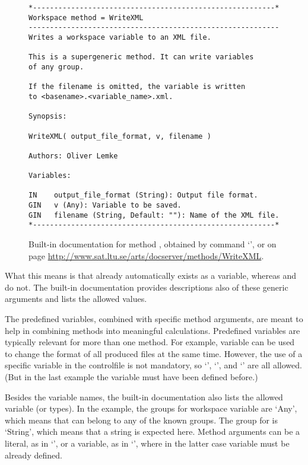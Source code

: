 \begin{figure}
\footnotesize
\begin{lstlisting}
*---------------------------------------------------------*
Workspace method = WriteXML
-----------------------------------------------------------
Writes a workspace variable to an XML file.

This is a supergeneric method. It can write variables 
of any group.

If the filename is omitted, the variable is written
to <basename>.<variable_name>.xml.

Synopsis:

WriteXML( output_file_format, v, filename )

Authors: Oliver Lemke

Variables:

IN    output_file_format (String): Output file format.
GIN   v (Any): Variable to be saved.
GIN   filename (String, Default: ""): Name of the XML file.
*---------------------------------------------------------*
\end{lstlisting}
\caption{Built-in documentation for method , obtained by
  command `', or on page
  \url{http://www.sat.ltu.se/arts/docserver/methods/WriteXML}.}
\label{fig:WriteXML}
\end{figure}

What this means is that  already automatically
exists as a variable, whereas  and 
do not. The built-in documentation provides descriptions also of these generic
arguments and lists the allowed values.

The predefined variables, combined with specific method arguments, are meant to
help in combining methods into meaningful calculations. Predefined variables
are typically relevant for more than one method. For example, variable
 can be used to change the format of all produced
files at the same time. However, the use of a specific variable in the
controlfile is not mandatory, so `', `', and
`' are all allowed. (But in the
last example the variable  must have been defined before.)

Besides the variable names, the built-in documentation also lists the allowed
variable  (or types). In the example, the groups for workspace variable
 are `Any', which means that  can belong to any of the
known groups. The group for  is `String', which means that a
string is expected here. Method arguments can be a literal, as in
`', or a variable, as in
`', where in the latter case variable
 must be already defined.

